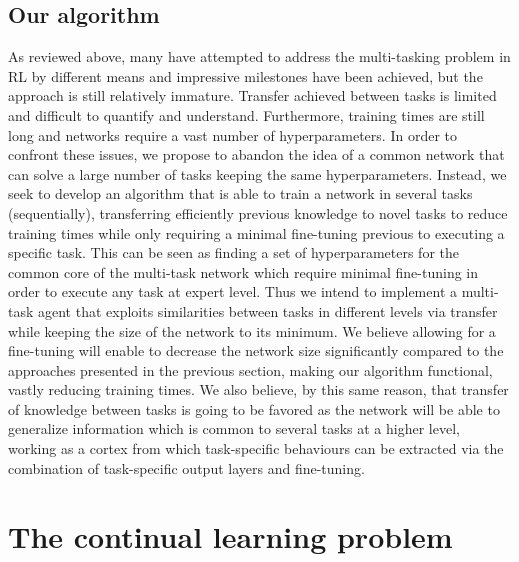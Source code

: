 \documentclass{article}
\begin{document}
\subsection{Our algorithm}
As reviewed above, many have attempted to address the multi-tasking problem in RL by different means and impressive milestones have been achieved, but the approach is still relatively immature. Transfer achieved between tasks is limited and difficult to quantify and understand. Furthermore, training times are still long and networks require a vast number of hyperparameters. In order to confront these issues, we propose to abandon the idea of a common network that can solve a large number of tasks keeping the same hyperparameters. Instead, we seek to develop an algorithm that is able to train a network in several tasks (sequentially), transferring efficiently previous knowledge to novel tasks to reduce training times while only requiring a minimal fine-tuning previous to executing a specific task. This can be seen as finding a set of hyperparameters for the common core of the multi-task network which require minimal fine-tuning in order to execute any task at expert level. Thus we intend to implement a multi-task agent that exploits similarities between tasks in different levels via transfer while keeping the size of the network to its minimum. We believe allowing for a fine-tuning will enable to decrease the network size significantly compared to the approaches presented in the previous section, making our algorithm functional, vastly reducing training times. We also believe, by this same reason, that transfer of knowledge between tasks is going to be favored as the network will be able to generalize information which is common to several tasks at a higher level, working as a cortex from which task-specific behaviours can be extracted via the combination of task-specific output layers and fine-tuning.\\
\newline

\section{The continual learning problem}
\end{document}

